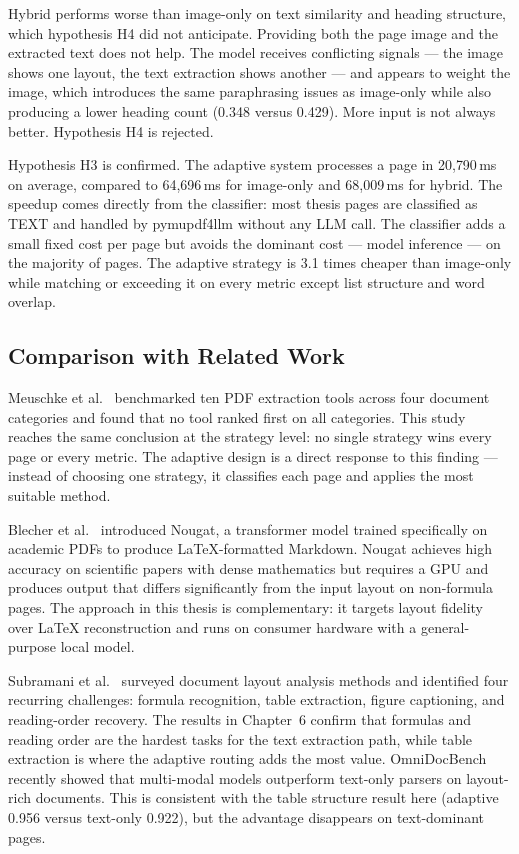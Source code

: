 \documentclass[12pt]{article}
\begin{document}
Hybrid performs worse than image-only on text similarity and heading
structure, which hypothesis H4 did not anticipate. Providing both the
page image and the extracted text does not help. The model receives
conflicting signals — the image shows one layout, the text extraction
shows another — and appears to weight the image, which introduces the
same paraphrasing issues as image-only while also producing a lower
heading count (0.348 versus 0.429). More input is not always better.
Hypothesis H4 is rejected.

Hypothesis H3 is confirmed. The adaptive system processes a page in
20{,}790\,ms on average, compared to 64{,}696\,ms for image-only and
68{,}009\,ms for hybrid. The speedup comes directly from the
classifier: most thesis pages are classified as TEXT and handled by
pymupdf4llm without any LLM call. The classifier adds a small fixed
cost per page but avoids the dominant cost — model inference — on the
majority of pages. The adaptive strategy is 3.1 times cheaper than
image-only while matching or exceeding it on every metric except list
structure and word overlap.

\subsection{Comparison with Related Work}

Meuschke et al.\ \cite{meuschke2023} benchmarked ten PDF extraction
tools across four document categories and found that no tool ranked
first on all categories. This study reaches the same conclusion at the
strategy level: no single strategy wins every page or every metric. The
adaptive design is a direct response to this finding — instead of
choosing one strategy, it classifies each page and applies the most
suitable method.

Blecher et al.\ \cite{blecher2023} introduced Nougat, a transformer
model trained specifically on academic PDFs to produce LaTeX-formatted
Markdown. Nougat achieves high accuracy on scientific papers with dense
mathematics but requires a GPU and produces output that differs
significantly from the input layout on non-formula pages. The approach
in this thesis is complementary: it targets layout fidelity over LaTeX
reconstruction and runs on consumer hardware with a general-purpose
local model.

Subramani et al.\ \cite{subramani2020} surveyed document layout
analysis methods and identified four recurring challenges: formula
recognition, table extraction, figure captioning, and reading-order
recovery. The results in Chapter~6 confirm that formulas and reading
order are the hardest tasks for the text extraction path, while table
extraction is where the adaptive routing adds the most value.
OmniDocBench \cite{omnidocbench2025} recently showed that multi-modal
models outperform text-only parsers on layout-rich documents. This is
consistent with the table structure result here (adaptive 0.956 versus
text-only 0.922), but the advantage disappears on text-dominant pages.
\end{document}
